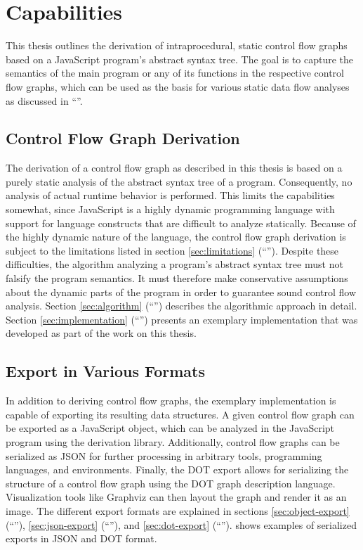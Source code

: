 \section{Capabilities}

This thesis outlines the derivation of intraprocedural, static control flow graphs based on a JavaScript program's abstract syntax tree. The goal is to capture the semantics of the main program or any of its functions in the respective control flow graphs, which can be used as the basis for various static data flow analyses as discussed in ``''.


\subsection{Control Flow Graph Derivation}

The derivation of a control flow graph as described in this thesis is based on a purely static analysis of the abstract syntax tree of a program. Consequently, no analysis of actual runtime behavior is performed. This limits the capabilities somewhat, since JavaScript is a highly dynamic programming language with support for language constructs that are difficult to analyze statically. Because of the highly dynamic nature of the language, the control flow graph derivation is subject to the limitations listed in section \ref{sec:limitations} (``''). Despite these difficulties, the algorithm analyzing a program's abstract syntax tree must not falsify the program semantics. It must therefore make conservative assumptions about the dynamic parts of the program in order to guarantee sound control flow analysis. Section \ref{sec:algorithm} (``'') describes the algorithmic approach in detail. Section \ref{sec:implementation} (``'') presents an exemplary implementation that was developed as part of the work on this thesis.


\subsection{Export in Various Formats}

In addition to deriving control flow graphs, the exemplary implementation is capable of exporting its resulting data structures. A given control flow graph can be exported as a JavaScript object, which can be analyzed in the JavaScript program using the derivation library. Additionally, control flow graphs can be serialized as JSON for further processing in arbitrary tools, programming languages, and environments. Finally, the DOT export allows for serializing the structure of a control flow graph using the DOT \cite{dot-language} graph description language. Visualization tools like Graphviz \cite{graphviz} can then layout the graph and render it as an image. The different export formats are explained in sections \ref{sec:object-export} (``''), \ref{sec:json-export} (``''), and \ref{sec:dot-export} (``'').  shows examples of serialized exports in JSON and DOT format.
